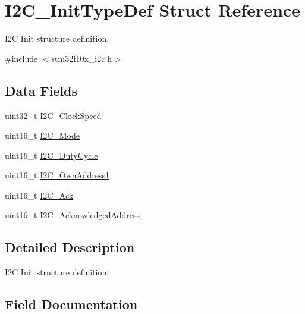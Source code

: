 \hypertarget{struct_i2_c___init_type_def}{}\section{I2\+C\+\_\+\+Init\+Type\+Def Struct Reference}
\label{struct_i2_c___init_type_def}


I2C Init structure definition.  




{\ttfamily \#include $<$stm32f10x\+\_\+i2c.\+h$>$}

\subsection*{Data Fields}
\begin{DoxyCompactItemize}
\item 
uint32\+\_\+t \mbox{\hyperlink{struct_i2_c___init_type_def_af8d72d15cd29b7e69591ce3edab497f6}{I2\+C\+\_\+\+Clock\+Speed}}
\item 
uint16\+\_\+t \mbox{\hyperlink{struct_i2_c___init_type_def_a165269b65702e348e32ccd8029e65af1}{I2\+C\+\_\+\+Mode}}
\item 
uint16\+\_\+t \mbox{\hyperlink{struct_i2_c___init_type_def_a349afc2bb8534c072349a6061f29344a}{I2\+C\+\_\+\+Duty\+Cycle}}
\item 
uint16\+\_\+t \mbox{\hyperlink{struct_i2_c___init_type_def_ae62dca9cea4fdb3eb8f9554b5f35fe4f}{I2\+C\+\_\+\+Own\+Address1}}
\item 
uint16\+\_\+t \mbox{\hyperlink{struct_i2_c___init_type_def_ab21d61d68d06e97d7c0ab90c8e396464}{I2\+C\+\_\+\+Ack}}
\item 
uint16\+\_\+t \mbox{\hyperlink{struct_i2_c___init_type_def_af46be2bc866a7dbf0d529dd770b105b3}{I2\+C\+\_\+\+Acknowledged\+Address}}
\end{DoxyCompactItemize}


\subsection{Detailed Description}
I2C Init structure definition. 



\subsection{Field Documentation}
\mbox{\label{struct_i2_c___init_type_def_ab21d61d68d06e97d7c0ab90c8e396464}} 
